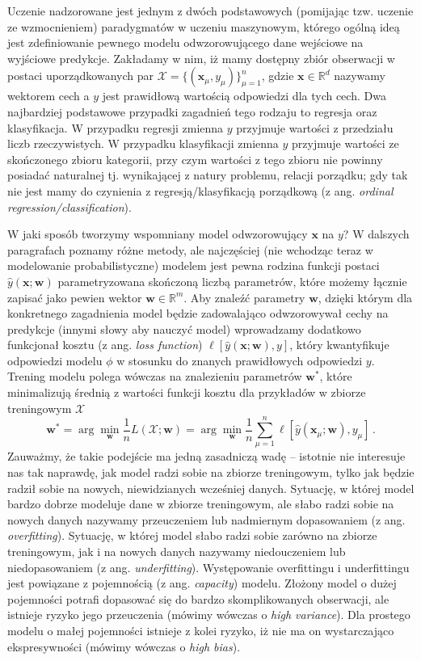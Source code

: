 \documentclass{myclass}
\numberwithin{equation}{subsection}
\begin{document}
Uczenie nadzorowane jest jednym z dwóch podstawowych (pomijając tzw. uczenie ze wzmocnieniem)
paradygmatów w uczeniu maszynowym, którego ogólną ideą jest zdefiniowanie pewnego modelu
odwzorowującego dane wejściowe na wyjściowe predykcje. Zakładamy w nim, iż mamy dostępny zbiór
obserwacji w postaci uporządkowanych par \(\mathcal{X} = \{(\bm{x}_\mu, y_\mu)\}_{\mu=1}^n\), gdzie
\(\bm{x} \in \mathbb{R}^d\) nazywamy wektorem cech a \(y\) jest prawidłową wartością odpowiedzi dla
tych cech. Dwa najbardziej podstawowe przypadki zagadnień tego rodzaju to regresja oraz
klasyfikacja. W przypadku regresji zmienna \(y\) przyjmuje wartości z przedziału liczb
rzeczywistych. W przypadku klasyfikacji zmienna \(y\) przyjmuje wartości ze skończonego zbioru
kategorii, przy czym wartości z tego zbioru nie powinny posiadać naturalnej tj. wynikającej z natury
problemu, relacji porządku; gdy tak nie jest mamy do czynienia z regresją/klasyfikacją porządkową (z
ang. \textit{ordinal regression/classification}).

W jaki sposób tworzymy wspomniany model odwzorowujący \(\bm{x}\) na \(y\)? W dalszych paragrafach
poznamy różne metody, ale najczęściej (nie wchodząc teraz w modelowanie probabilistyczne) modelem
jest pewna rodzina funkcji postaci \(\hat{y}(\bm{x}; \bm{w})\) parametryzowana skończoną liczbą
parametrów, które możemy łącznie zapisać jako pewien wektor \(\bm{w} \in \mathbb{R}^m\). Aby znaleźć
parametry \(\bm{w}\), dzięki którym dla konkretnego zagadnienia model będzie zadowalająco
odwzorowywał cechy na predykcje (innymi słowy aby nauczyć model) wprowadzamy dodatkowo funkcjonał
kosztu (z ang. \textit{loss function}) \(\ell[\hat{y}(\bm{x};\bm{w}), y]\), który kwantyfikuje
odpowiedzi modelu \(\phi\) w stosunku do znanych prawidłowych odpowiedzi \(y\). Trening modelu
polega wówczas na znalezieniu parametrów \(\bm{w}^*\), które minimalizują średnią z wartości funkcji
kosztu dla przykładów w zbiorze treningowym \(\mathcal{X}\)
\begin{equation}
    \bm{w}^* = \arg\min_{\bm{w}} \frac{1}{n}L(\mathcal{X};\bm{w}) = \arg\min_{\bm{w}} \frac{1}{n}\sum_{\mu=1}^n \ell[\hat{y}(\bm{x}_\mu;\bm{w}), y_\mu]\,.
\end{equation}
Zauważmy, że takie podejście ma jedną zasadniczą wadę -- istotnie nie interesuje nas tak naprawdę,
jak model radzi sobie na zbiorze treningowym, tylko jak będzie radził sobie na nowych, niewidzianych
wcześniej danych. Sytuację, w której model bardzo dobrze modeluje dane w zbiorze treningowym, ale
słabo radzi sobie na nowych danych nazywamy przeuczeniem lub nadmiernym dopasowaniem (z ang.
\textit{overfitting}). Sytuację, w której model słabo radzi sobie zarówno na zbiorze treningowym,
jak i na nowych danych nazywamy niedouczeniem lub niedopasowaniem (z ang. \textit{underfitting}).
Występowanie overfittingu i underfittingu jest powiązane z pojemnością (z ang. \textit{capacity})
modelu. Złożony model o dużej pojemności potrafi dopasować się do bardzo skomplikowanych obserwacji,
ale istnieje ryzyko jego przeuczenia (mówimy wówczas o \textit{high variance}). Dla prostego modelu
o małej pojemności istnieje z kolei ryzyko, iż nie ma on wystarczająco ekspresywności (mówimy
wówczas o \textit{high bias}).
 
\end{document}
